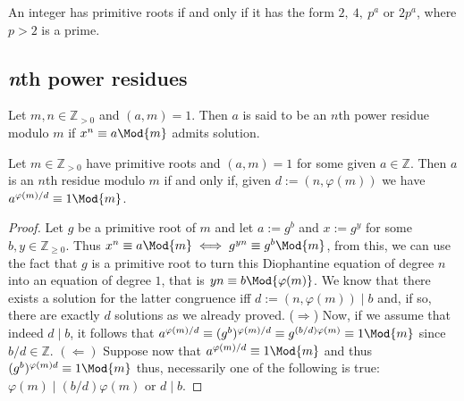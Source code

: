 \begin{proposition}
    An integer has primitive roots if and only if it has the form  \(2,\ 4,\
    p^a\) or \(2p^a\), where \(p > 2\) is a prime.
\end{proposition}

\subsection{\textit{n}th power residues}

\begin{definition}
    Let \(m, n \in \mathbb{Z}_{>0}\) and \((a, m) = 1\). Then \(a\) is said to be
    an \(n\)th power residue modulo \(m\) if  \(x^n \equiv a \Mod{m}\) admits
    solution.
\end{definition}

\begin{proposition}
    Let \(m \in \mathbb{Z}_{>0}\) have primitive roots and \((a, m) = 1\) for
    some given \(a \in \mathbb{Z}\). Then \(a\) is an  \(n \)th residue modulo
    \(m\) if and only if, given \(d := (n, \varphi(m))\) we have
    \(a^{\varphi(m)/d} \equiv 1 \Mod{m}\).
\end{proposition}

\begin{proof}
    Let \(g\) be a primitive root of \(m\) and let \(a := g^b\) and \(x := g^y\)
    for some \(b, y \in \mathbb{Z}_{\geqslant 0}\). Thus \(x^n \equiv a \Mod{m}
    \iff g^{yn} \equiv g^b \Mod{m}\), from this, we can use the fact that \(g\)
    is a primitive root to turn this Diophantine equation of degree \(n\) into
    an equation of degree \(1\), that is \(y n \equiv b \Mod{\varphi(m)}\).
    We know that there exists a solution for the latter congruence iff  \(d :=
    (n, \varphi(m)) \mid b\) and, if so, there are exactly \(d\) solutions as we
    already proved. (\(\Rightarrow\)) Now, if we assume that indeed \(d \mid b\),
    it follows that \(a^{\varphi(m)/d} \equiv (g^{b})^{\varphi(m)/d} \equiv
    g^{(b/d)\varphi(m)} \equiv 1 \Mod{m}\) since \(b/d \in \mathbb{Z}\).
    \((\Leftarrow)\) Suppose now that \(a^{\varphi(m)/d} \equiv 1 \Mod{m}\) and
    thus \((g^b)^{\varphi(m)d} \equiv 1 \Mod{m}\) thus, necessarily one of the
    following is true: \(\varphi(m) \mid (b/d)\varphi(m)\) or \(d \mid b\).
\end{proof}

